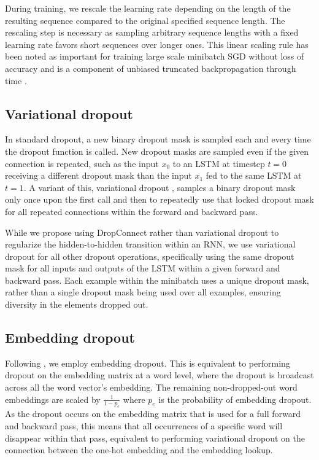 \documentclass{article}
\begin{document}
During training, we rescale the learning rate depending on the length of the resulting sequence compared to the original specified sequence length.
The rescaling step is necessary as sampling arbitrary sequence lengths with a fixed learning rate favors short sequences over longer ones.
This linear scaling rule has been noted as important for training large scale minibatch SGD without loss of accuracy \citep{Goyal2017} and is a component of unbiased truncated backpropagation through time \citep{Tallec2017}.

\subsection{Variational dropout}
In standard dropout, a new binary dropout mask is sampled each and every time the dropout function is called.
New dropout masks are sampled even if the given connection is repeated, such as the input $x_0$ to an LSTM at timestep $t=0$ receiving a different dropout mask than the input $x_1$ fed to the same LSTM at $t=1$.
A variant of this, variational dropout \cite{Gal2016ATG}, samples a binary dropout mask only once upon the first call and then to repeatedly use that locked dropout mask for all repeated connections within the forward and backward pass.

While we propose using DropConnect rather than variational dropout to regularize the hidden-to-hidden transition within an RNN, we use variational dropout for all other dropout operations, specifically using the same dropout mask for all inputs and outputs of the LSTM within a given forward and backward pass.
Each example within the minibatch uses a unique dropout mask, rather than a single dropout mask being used over all examples, ensuring diversity in the elements dropped out.

\subsection{Embedding dropout}

Following \citet{Gal2016ATG}, we employ embedding dropout.
This is equivalent to performing dropout on the embedding matrix at a word level, where the dropout is broadcast across all the word vector's embedding.
The remaining non-dropped-out word embeddings are scaled by $\frac{1}{1 - p_e}$ where $p_e$ is the probability of embedding dropout.
As the dropout occurs on the embedding matrix that is used for a full forward and backward pass, this means that all occurrences of a specific word will disappear within that pass, equivalent to performing variational dropout on the connection between the one-hot embedding and the embedding lookup.
\end{document}
